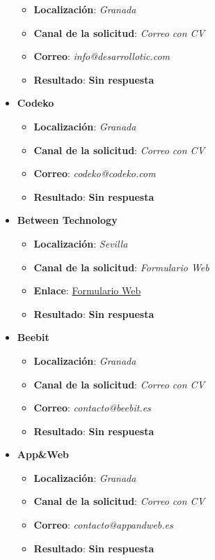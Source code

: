\begin{itemize}
\begin{itemize}
		\item \textbf{Localización}: \textit{Granada}
		\item \textbf{Canal de la solicitud}: \textit{Correo con CV}
		\item \textbf{Correo}: \textit{info@desarrollotic.com}
		\item \textbf{Resultado}: {\color{orange} \textbf{Sin respuesta}}
	\end{itemize}
	\item \textbf{Codeko}
	\begin{itemize}
		\item \textbf{Localización}: \textit{Granada}
		\item \textbf{Canal de la solicitud}: \textit{Correo con CV}
		\item \textbf{Correo}: \textit{codeko@codeko.com}
		\item \textbf{Resultado}: {\color{orange} \textbf{Sin respuesta}}
	\end{itemize}
	\item \textbf{Between Technology}
	\begin{itemize}
		\item \textbf{Localización}: \textit{Sevilla}
		\item \textbf{Canal de la solicitud}: \textit{Formulario Web}
		\item \textbf{Enlace}: \href{https://between.talentclue.com/es/node/add/cv/job/5810780/company/94766327/12623479?clicked_button=apply_manually}{Formulario Web}
		\item \textbf{Resultado}: {\color{orange} \textbf{Sin respuesta}}
	\end{itemize}
	\item \textbf{Beebit}
	\begin{itemize}
		\item \textbf{Localización}: \textit{Granada}
		\item \textbf{Canal de la solicitud}: \textit{Correo con CV}
		\item \textbf{Correo}: \textit{contacto@beebit.es}
		\item \textbf{Resultado}: {\color{orange} \textbf{Sin respuesta}}
	\end{itemize}
		\item \textbf{App\&Web}
	\begin{itemize}
		\item \textbf{Localización}: \textit{Granada}
		\item \textbf{Canal de la solicitud}: \textit{Correo con CV}
		\item \textbf{Correo}: \textit{contacto@appandweb.es}
		\item \textbf{Resultado}: {\color{orange} \textbf{Sin respuesta}}
	\end{itemize}
\end{itemize}

